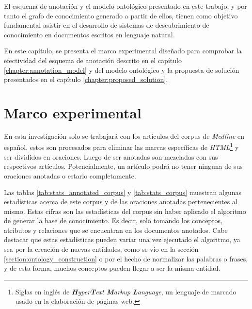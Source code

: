 \label{chapter:analysis_of_results}

\setcounter{footnote}{5}

El esquema de anotación y el modelo ontológico presentado en este trabajo, y por tanto el grafo de conocimiento generado a partir de ellos, tienen como objetivo fundamental asistir en el desarrollo de sistemas de descubrimiento de conocimiento en documentos escritos en lenguaje natural.

En este capítulo, se presenta el marco experimental diseñado para comprobar la efectividad del esquema de anotación descrito en el capítulo \ref{chapter:annotation_model} y del modelo ontológico y la propuesta de solución presentados en el capítulo \ref{chapter:proposed_solution}.

\section{Marco experimental}
En esta investigación solo se trabajará con los artículos del corpus de \textit{Medline} en español, estos son procesados para eliminar las marcas específicas de \textit{HTML}\footnote{Siglas en inglés de \textit{\textbf{H}yper\textbf{T}ext \textbf{M}arkup \textbf{L}anguage}, un lenguaje de marcado usado en la elaboración de páginas web.} y ser divididos en oraciones. Luego de ser anotadas son mezcladas con sus respectivos artículos. Potencialmente, un artículo podrá no tener ninguna de sus oraciones anotadas o estarlo completamente.

Las tablas \ref{tab:stats_annotated_corpus} y \ref{tab:stats_corpus} muestran algunas estadísticas acerca de este corpus y de las oraciones anotadas pertenecientes al mismo. Estas cifras son las estadísticas del corpus sin haber aplicado el algoritmo de generar la base de conocimiento. Es decir, solo tomando los conceptos, atributos y relaciones que se encuentran en los documentos anotados. Cabe destacar que estas estadísticas pueden variar una vez ejecutado el algoritmo, ya sea por la creación de nuevas entidades, como se vio en la sección \ref{section:ontology_construction} o por el hecho de normalizar las palabras o frases, y de esta forma, muchos conceptos pueden llegar a ser la misma entidad.

